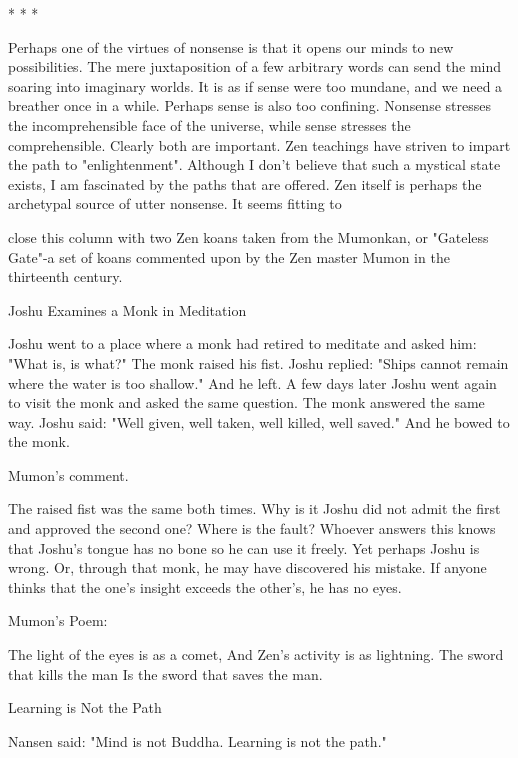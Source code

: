                                          *   *   *

        Perhaps one of the virtues of nonsense is that it opens our minds to new
possibilities. The mere juxtaposition of a few arbitrary words can send the mind soaring
into imaginary worlds. It is as if sense were too mundane, and we need a breather once in
a while. Perhaps sense is also too confining. Nonsense stresses the incomprehensible face
of the universe, while sense stresses the comprehensible. Clearly both are important. Zen
teachings have striven to impart the path to "enlightenment". Although I don't believe that
such a mystical state exists, I am fascinated by the paths that are offered. Zen itself is
perhaps the archetypal source of utter nonsense. It seems fitting to





close this column with two Zen koans taken from the Mumonkan, or "Gateless Gate"-a
set of koans commented upon by the Zen master Mumon in the thirteenth century.

                         Joshu Examines a Monk in Meditation

Joshu went to a place where a monk had retired to meditate and asked him: "What is, is
what?" The monk raised his fist. Joshu replied: "Ships cannot remain where the water is
too shallow." And he left. A few days later Joshu went again to visit the monk and asked
the same question. The monk answered the same way. Joshu said: "Well given, well
taken, well killed, well saved." And he bowed to the monk.

Mumon's comment.

The raised fist was the same both times. Why is it Joshu did not admit the first and
approved the second one? Where is the fault? Whoever answers this knows that Joshu's
tongue has no bone so he can use it freely. Yet perhaps Joshu is wrong. Or, through that
monk, he may have discovered his mistake. If anyone thinks that the one's insight
exceeds the other's, he has no eyes.

              Mumon's Poem:

              The light of the eyes is as a comet,
              And Zen's activity is as lightning.
              The sword that kills the man
              Is the sword that saves the man.


              Learning is Not the Path

              Nansen said: "Mind is not Buddha. Learning is not the path."

